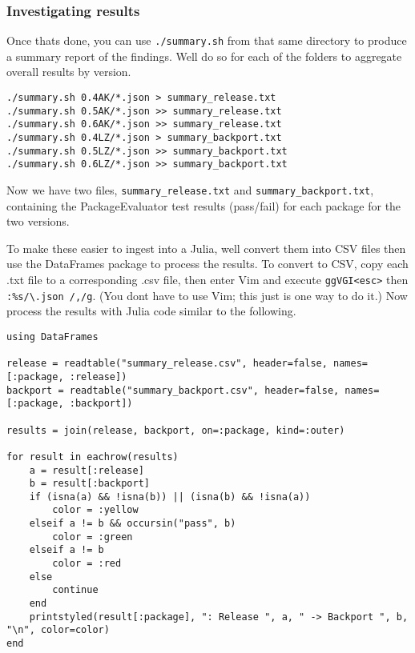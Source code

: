 \hypertarget{9508198716944071618}{}


\subsubsection{Investigating results}



Once that{\textquotesingle}s done, you can use \texttt{./summary.sh} from that same directory to produce a summary report of the findings. We{\textquotesingle}ll do so for each of the folders to aggregate overall results by version.




\begin{lstlisting}
./summary.sh 0.4AK/*.json > summary_release.txt
./summary.sh 0.5AK/*.json >> summary_release.txt
./summary.sh 0.6AK/*.json >> summary_release.txt
./summary.sh 0.4LZ/*.json > summary_backport.txt
./summary.sh 0.5LZ/*.json >> summary_backport.txt
./summary.sh 0.6LZ/*.json >> summary_backport.txt
\end{lstlisting}



Now we have two files, \texttt{summary\_release.txt} and \texttt{summary\_backport.txt}, containing the PackageEvaluator test results (pass/fail) for each package for the two versions.



To make these easier to ingest into a Julia, we{\textquotesingle}ll convert them into CSV files then use the DataFrames package to process the results. To convert to CSV, copy each .txt file to a corresponding .csv file, then enter Vim and execute \texttt{ggVGI{\textquotedbl}<esc>} then \texttt{:\%s/{\textbackslash}.json /{\textquotedbl},/g}. (You don{\textquotesingle}t have to use Vim; this just is one way to do it.) Now process the results with Julia code similar to the following.




\begin{verbatim}
using DataFrames

release = readtable("summary_release.csv", header=false, names=[:package, :release])
backport = readtable("summary_backport.csv", header=false, names=[:package, :backport])

results = join(release, backport, on=:package, kind=:outer)

for result in eachrow(results)
    a = result[:release]
    b = result[:backport]
    if (isna(a) && !isna(b)) || (isna(b) && !isna(a))
        color = :yellow
    elseif a != b && occursin("pass", b)
        color = :green
    elseif a != b
        color = :red
    else
        continue
    end
    printstyled(result[:package], ": Release ", a, " -> Backport ", b, "\n", color=color)
end
\end{verbatim}



